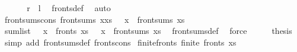 \begin{isabellebody}
\ \ \isamarkupfalse%
\isanewline
\ \ \isamarkupfalse%
\ {\isachardoublequoteopen}{\isacharquery}{\kern0pt}r\ {\isasymsubseteq}\ {\isacharquery}{\kern0pt}l{\isachardoublequoteclose}\ \isamarkupfalse%
\ fronts{\isacharunderscore}{\kern0pt}def\ \isamarkupfalse%
\ auto\isanewline
{}\isamarkupfalse%
%
\endisatagproof
{\isafoldproof}%
%
\isadelimproof
\isanewline
%
\endisadelimproof
\isanewline
{}\isamarkupfalse%
\ front{\isacharunderscore}{\kern0pt}sums{\isacharunderscore}{\kern0pt}cons{\isacharcolon}{\kern0pt}\ {\isachardoublequoteopen}front{\isacharunderscore}{\kern0pt}sums\ {\isacharparenleft}{\kern0pt}x{\isacharhash}{\kern0pt}xs{\isacharparenright}{\kern0pt}\ {\isacharequal}{\kern0pt}\ {\isacharparenleft}{\kern0pt}{\isacharplus}{\kern0pt}{\isacharparenright}{\kern0pt}\ x\ {\isacharbackquote}{\kern0pt}\ front{\isacharunderscore}{\kern0pt}sums\ xs\ {\isasymunion}\ {\isacharbraceleft}{\kern0pt}{}{\isacharbraceright}{\kern0pt}{\isachardoublequoteclose}\isanewline
%
\isadelimproof
%
\endisadelimproof
%
\isatagproof
{}\isamarkupfalse%
\ {\isacharminus}{\kern0pt}\isanewline
\ \ \isamarkupfalse%
\ {\isachardoublequoteopen}sum{\isacharunderscore}{\kern0pt}list\ {\isacharbackquote}{\kern0pt}\ {\isacharparenleft}{\kern0pt}{\isacharparenleft}{\kern0pt}{\isacharhash}{\kern0pt}{\isacharparenright}{\kern0pt}\ x{\isacharparenright}{\kern0pt}\ {\isacharbackquote}{\kern0pt}\ fronts\ xs\ {\isacharequal}{\kern0pt}\ {\isacharparenleft}{\kern0pt}{\isacharplus}{\kern0pt}{\isacharparenright}{\kern0pt}\ x\ {\isacharbackquote}{\kern0pt}\ front{\isacharunderscore}{\kern0pt}sums\ xs{\isachardoublequoteclose}\ \isamarkupfalse%
\ front{\isacharunderscore}{\kern0pt}sums{\isacharunderscore}{\kern0pt}def\ \isamarkupfalse%
\ force\isanewline
\ \ \isamarkupfalse%
\ \isamarkupfalse%
\ {\isacharquery}{\kern0pt}thesis\ \isamarkupfalse%
\ {\isacharparenleft}{\kern0pt}simp\ add{\isacharcolon}{\kern0pt}\ front{\isacharunderscore}{\kern0pt}sums{\isacharunderscore}{\kern0pt}def\ fronts{\isacharunderscore}{\kern0pt}cons{\isacharparenright}{\kern0pt}\isanewline
{}\isamarkupfalse%
%
\endisatagproof
{\isafoldproof}%
%
\isadelimproof
\isanewline
%
\endisadelimproof
\isanewline
{}\isamarkupfalse%
\ finite{\isacharunderscore}{\kern0pt}fronts{\isacharcolon}{\kern0pt}\ {\isachardoublequoteopen}finite\ {\isacharparenleft}{\kern0pt}fronts\ xs{\isacharparenright}{\kern0pt}{\isachardoublequoteclose}\isanewline

\end{isabellebody}
